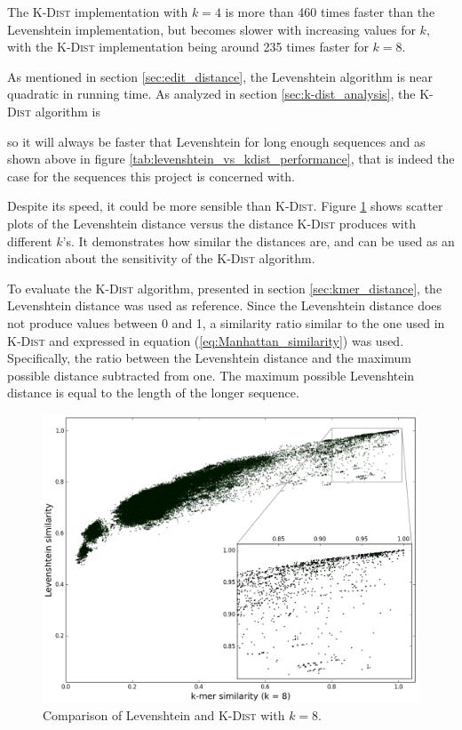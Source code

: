 The \textsc{K-Dist} implementation with $k=4$ is more than 460 times faster
than the Levenshtein implementation, but becomes slower with increasing values
for $k$, with the \textsc{K-Dist} implementation being around 235 times faster
for $k=8$.

As mentioned in section \ref{sec:edit_distance}, the Levenshtein algorithm is
near quadratic in running time. As analyzed in section
\ref{sec:k-dist_analysis}, the \textsc{K-Dist} algorithm is


so it will always be faster that Levenshtein for long enough sequences and as
shown above in figure \ref{tab:levenshtein_vs_kdist_performance}, that is indeed
the case for the sequences this project is concerned with.



Despite its speed, it could be more sensible than \textsc{K-Dist}. Figure
\ref{fig:Levenshtein_vs_KDist} shows scatter plots of the Levenshtein distance
versus the distance \textsc{K-Dist} produces with different $k$'s. It
demonstrates how similar the distances are, and can be used as an indication
about the sensitivity of the \textsc{K-Dist} algorithm.


To evaluate the \textsc{K-Dist} algorithm, presented in section
\ref{sec:kmer_distance}, the Levenshtein distance was used as reference. Since
the Levenshtein distance does not produce values between 0 and 1, a similarity
ratio similar to the one used in \textsc{K-Dist} and expressed in equation
(\ref{eq:Manhattan_similarity}) was used. Specifically, the ratio between the
Levenshtein distance and the maximum possible distance subtracted from one. The
maximum possible Levenshtein distance is equal to the length of the longer
sequence.

\begin{figure}[H]
  \includegraphics[width=1.0\textwidth]{graphics/Levenshtein_K-Dist_k8.png}
  \caption{Comparison of Levenshtein and \textsc{K-Dist} with $k=8$.}
  \label{fig:Levenshtein_vs_KDist}
\end{figure}



